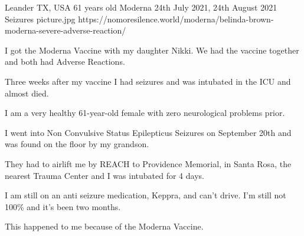 {Leander TX, USA}
{61 years old}
{Moderna}
{24th July 2021, 24th August 2021}
{Seizures}
{picture.jpg}
{https://nomoresilence.world/moderna/belinda-brown-moderna-severe-adverse-reaction/}
{

I got the Moderna Vaccine with my daughter Nikki. We had the vaccine together
and both had Adverse Reactions.

Three weeks after my vaccine I had seizures and was intubated in the ICU and
almost died.

I am a very healthy 61-year-old female with zero neurological problems prior.

I went into Non Convulsive Status Epilepticus Seizures on September 20th and was
found on the floor by my grandson.

They had to airlift me by REACH to Providence Memorial, in Santa Rosa, the
nearest Trauma Center and I was intubated for 4 days.

I am still on an anti seizure medication, Keppra, and can’t drive. I’m still not
100\% and it’s been two months.

This happened to me because of the Moderna Vaccine.

}
